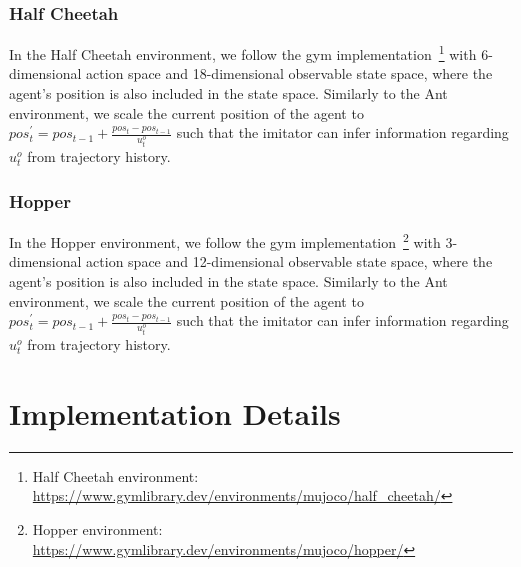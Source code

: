 \subsubsection{Half Cheetah}
In the Half Cheetah environment, we follow the gym implementation~\footnote{Half Cheetah environment: \url{https://www.gymlibrary.dev/environments/mujoco/half_cheetah/}} with 6-dimensional action space and 18-dimensional observable state space, where the agent's position is also included in the state space. Similarly to the Ant environment, we scale the current position of the agent to $pos_t^\prime= pos_{t-1}+\frac{pos_t-pos_{t-1}}{u^o_t}$ such that the imitator can infer information regarding $u^o_t$ from trajectory history.

\subsubsection{Hopper}
In the Hopper environment, we follow the gym implementation~\footnote{Hopper environment: \url{https://www.gymlibrary.dev/environments/mujoco/hopper/}} with 3-dimensional action space and 12-dimensional observable state space, where the agent's position is also included in the state space. Similarly to the Ant environment, we scale the current position of the agent to $pos_t^\prime= pos_{t-1}+\frac{pos_t-pos_{t-1}}{u^o_t}$ such that the imitator can infer information regarding $u^o_t$ from trajectory history.

\section{Implementation Details}
